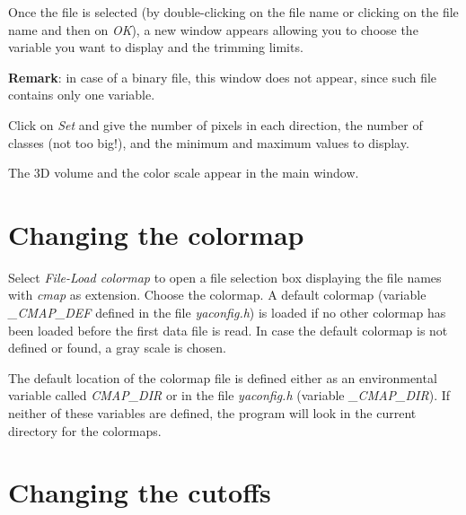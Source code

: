 \clearpage

Once the file is selected (by double-clicking on the file name or clicking on the
file name and then on {\em OK}), a new window appears allowing you to choose
the variable you want to display and the trimming limits.

{\bf Remark}: in case of a binary file, this window does not appear, since
such file contains only one variable.\\
\vspace{194pt}

\clearpage

Click on {\em Set} and give the number of pixels in each direction, the
number of classes (not too big!), and the minimum and maximum values to
display.\\
\vspace{346pt}

The 3D volume and the color scale appear in the main window.

\section{Changing the colormap}

Select {\em File-Load colormap} to open a file selection box displaying
the file names with {\em cmap} as extension. Choose the colormap.
A default colormap (variable {\em \_CMAP\_DEF} defined in the file
{\em yaconfig.h}) is loaded if
no other colormap has been loaded before the first data file is read.
In case the default colormap is not defined or found, a gray scale is chosen.

The default location of the colormap file is defined either as an
environmental variable called {\em CMAP\_DIR} or in the file {\em yaconfig.h}
(variable {\em \_CMAP\_DIR}).
If neither of these variables are defined, the program will look in
the current directory for the colormaps.

\section{Changing the cutoffs}


